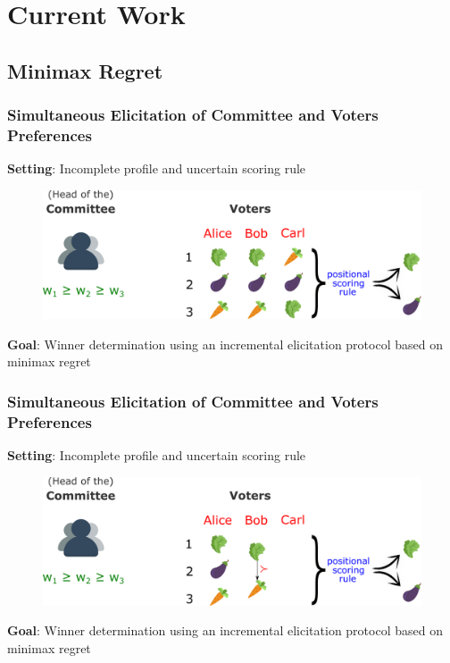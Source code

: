 \documentclass{beamer}
\begin{document}
\section{Current Work}
\subsection{Minimax Regret}

\begin{frame}
\frametitle{Simultaneous Elicitation of Committee and Voters Preferences}
\textbf{Setting}: Incomplete profile and uncertain scoring rule
\begin{figure}
	\includegraphics[scale=0.35]{set.png}
\end{figure}
\textbf{Goal}: Winner determination using an incremental elicitation protocol based on minimax regret \\ 
\end{frame}
\addtocounter{framenumber}{-1}
\begin{frame}
	\frametitle{Simultaneous Elicitation of Committee and Voters Preferences}
	\textbf{Setting}: Incomplete profile and uncertain scoring rule
	\begin{figure}
		\includegraphics[scale=0.35]{set2.png}
	\end{figure}
	\textbf{Goal}: Winner determination using an incremental elicitation protocol based on minimax regret \\ 
\end{frame}
\end{document}

